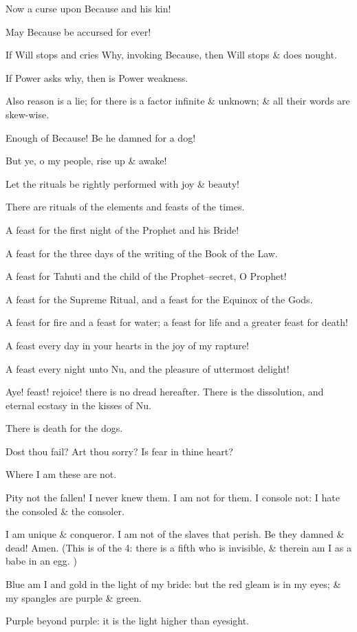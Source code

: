 Now a curse upon Because and his kin!

May Because be accursed for ever!

If Will stops and cries Why, invoking Because, then Will stops \& does nought.

If Power asks why, then is Power weakness.

Also reason is a lie; for there is a factor infinite \& unknown; \& all their words are skew-wise.

Enough of Because! Be he damned for a dog!

But ye, o my people, rise up \& awake!

Let the rituals be rightly performed with joy \& beauty!

There are rituals of the elements and feasts of the times.

A feast for the first night of the Prophet and his Bride!

A feast for the three days of the writing of the Book of the Law.

A feast for Tahuti and the child of the Prophet--secret, O Prophet!

A feast for the Supreme Ritual, and a feast for the Equinox of the Gods.

A feast for fire and a feast for water; a feast for life and a greater feast for death!

A feast every day in your hearts in the joy of my rapture!

A feast every night unto Nu, and the pleasure of uttermost delight!

Aye! feast! rejoice! there is no dread hereafter. There is the dissolution, and eternal ecstasy in the kisses of Nu.

There is death for the dogs.

Dost thou fail? Art thou sorry? Is fear in thine heart?

Where I am these are not.

Pity not the fallen! I never knew them. I am not for them. I console not: I hate the consoled \& the consoler.

I am unique \& conqueror. I am not of the slaves that perish. Be they damned \& dead! Amen. (This is of the 4: there is a fifth who is invisible, \& therein am I as a babe in an egg. )

Blue am I and gold in the light of my bride: but the red gleam is in my eyes; \& my spangles are purple \& green.

Purple beyond purple: it is the light higher than eyesight.

